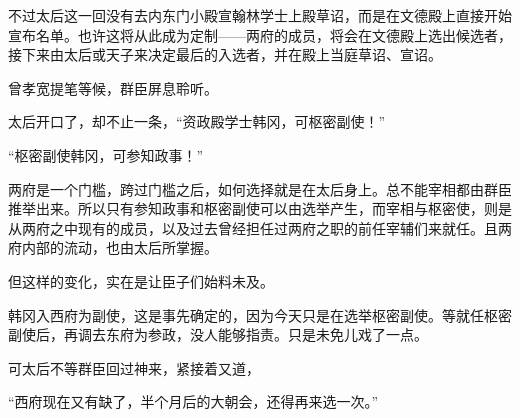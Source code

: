 不过太后这一回没有去内东门小殿宣翰林学士上殿草诏，而是在文德殿上直接开始宣布名单。也许这将从此成为定制——两府的成员，将会在文德殿上选出候选者，接下来由太后或天子来决定最后的入选者，并在殿上当庭草诏、宣诏。

曾孝宽提笔等候，群臣屏息聆听。

太后开口了，却不止一条，“资政殿学士韩冈，可枢密副使！”

“枢密副使韩冈，可参知政事！”

两府是一个门槛，跨过门槛之后，如何选择就是在太后身上。总不能宰相都由群臣推举出来。所以只有参知政事和枢密副使可以由选举产生，而宰相与枢密使，则是从两府之中现有的成员，以及过去曾经担任过两府之职的前任宰辅们来就任。且两府内部的流动，也由太后所掌握。

但这样的变化，实在是让臣子们始料未及。

韩冈入西府为副使，这是事先确定的，因为今天只是在选举枢密副使。等就任枢密副使后，再调去东府为参政，没人能够指责。只是未免儿戏了一点。

可太后不等群臣回过神来，紧接着又道，

“西府现在又有缺了，半个月后的大朝会，还得再来选一次。”

